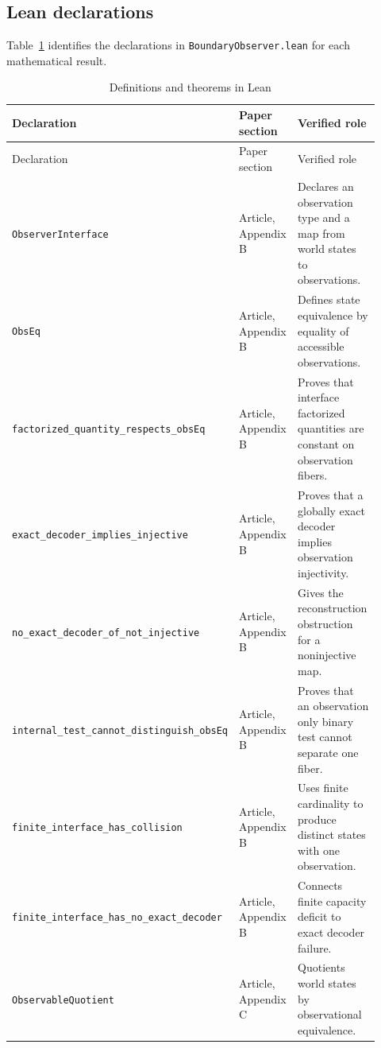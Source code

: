 \begin{landscape}
\section{Lean declarations}
\label{app:declarations}

Table~\ref{tab:declarations} identifies the declarations in \nolinkurl{BoundaryObserver.lean} for each mathematical result.

\small
\begin{longtable}{@{}>{\raggedright\arraybackslash}p{0.31\linewidth}>{\raggedright\arraybackslash}p{0.20\linewidth}>{\raggedright\arraybackslash}p{0.41\linewidth}@{}}
\caption{Definitions and theorems in Lean}\label{tab:declarations}\\
\toprule
Declaration & Paper section & Verified role \\
\midrule
\endfirsthead
\toprule
Declaration & Paper section & Verified role \\
\midrule
\endhead
\bottomrule
\endfoot
\nolinkurl{ObserverInterface} & Article, Appendix B & Declares an observation type and a map from world states to observations. \\
\nolinkurl{ObsEq} & Article, Appendix B & Defines state equivalence by equality of accessible observations. \\
\nolinkurl{factorized_quantity_respects_obsEq} & Article, Appendix B & Proves that interface factorized quantities are constant on observation fibers. \\
\nolinkurl{exact_decoder_implies_injective} & Article, Appendix B & Proves that a globally exact decoder implies observation injectivity. \\
\nolinkurl{no_exact_decoder_of_not_injective} & Article, Appendix B & Gives the reconstruction obstruction for a noninjective map. \\
\nolinkurl{internal_test_cannot_distinguish_obsEq} & Article, Appendix B & Proves that an observation only binary test cannot separate one fiber. \\
\nolinkurl{finite_interface_has_collision} & Article, Appendix B & Uses finite cardinality to produce distinct states with one observation. \\
\nolinkurl{finite_interface_has_no_exact_decoder} & Article, Appendix B & Connects finite capacity deficit to exact decoder failure. \\
\nolinkurl{ObservableQuotient} & Article, Appendix C & Quotients world states by observational equivalence. \\

\end{longtable}
\end{landscape}
